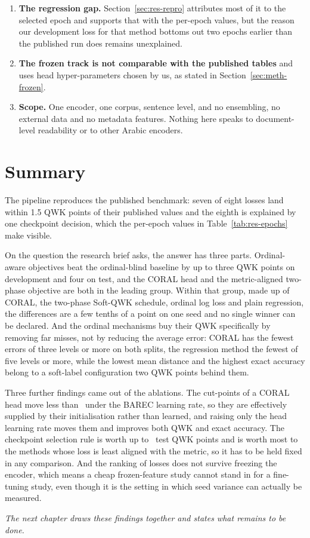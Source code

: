 \begin{enumerate}
\item \textbf{The regression gap.} Section~\ref{sec:res-repro} attributes most of it to the
selected epoch and supports that with the per-epoch values, but the reason our development loss
for that method bottoms out two epochs earlier than the published run does remains unexplained.

\item \textbf{The frozen track is not comparable with the published tables} and uses head
hyper-parameters chosen by us, as stated in Section~\ref{sec:meth-frozen}.

\item \textbf{Scope.} One encoder, one corpus, sentence level, and no ensembling, no external
data and no metadata features. Nothing here speaks to document-level readability or to other
Arabic encoders.
\end{enumerate}

\section{Summary}

The pipeline reproduces the published benchmark: seven of eight losses land within 1.5 QWK
points of their published values and the eighth is explained by one checkpoint decision, which
the per-epoch values in Table~\ref{tab:res-epochs} make visible.

On the question the research brief asks, the answer has three parts. Ordinal-aware objectives
beat the ordinal-blind baseline by up to three QWK points on development and four on test, and
the CORAL head and the metric-aligned two-phase objective are both in the leading group.
Within that group, made up of CORAL, the two-phase Soft-QWK schedule, ordinal log loss and
plain regression, the differences are a few tenths of a point on one seed and no single winner
can be declared. And the ordinal mechanisms buy their QWK specifically by removing far misses,
not by reducing the average error: CORAL has the fewest errors of three levels or more on both
splits, the regression method the fewest of five levels or more, while the lowest mean distance
and the highest exact accuracy belong to a soft-label configuration two QWK points behind them.

Three further findings came out of the ablations. The cut-points of a CORAL head move less than
\cutMoveFineCoral\ under the BAREC learning rate, so they are effectively supplied by their
initialisation rather than learned, and raising only the head learning rate moves them and
improves both QWK and exact accuracy. The checkpoint selection rule is worth up to
\qwkselTestGainMax\ test QWK points and is worth most to the methods whose loss is least
aligned with the metric, so it has to be held fixed in any comparison. And the ranking of
losses does not survive freezing the encoder, which means a cheap frozen-feature study cannot
stand in for a fine-tuning study, even though it is the setting in which seed variance can
actually be measured.

\textit{The next chapter draws these findings together and states what remains to be done.}
